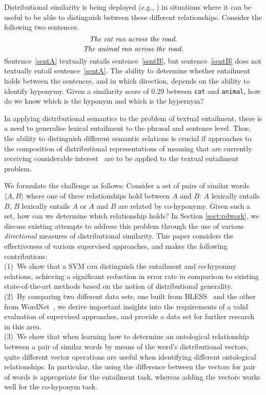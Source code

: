 \documentclass[11pt]{article}
\begin{document}
Distributional similarity is being deployed (e.g., ) in situations where it can be useful to be able to distinguish between these different relationships. Consider the following two sentences.
\begin{equation}
\label{sentA}
\mbox{\em The cat ran across the road.}
\end{equation}
\begin{equation}
\label{sentB}
\mbox{\em The animal ran across the road.}
\end{equation}
Sentence~\ref{sentA} textually entails sentence~\ref{sentB}, but sentence~\ref{sentB} does not textually entail sentence~\ref{sentA}. The ability to determine whether entailment holds between the sentences, and in which direction, depends on the ability to identify hyponymy.   Given a similarity score of 0.29 between \texttt{cat} and \texttt{animal}, how do we know which is the hyponym and which is the hypernym? 

In applying distributional semantics to the problem of textual entailment, there is a need to generalise lexical entailment to the phrasal and sentence level. Thus, the ability to distinguish different semantic relations is crucial if approaches to the composition of distributional representations of meaning that are currently receiving considerable interest~\cite{Widdows:08,Mitchell:08,Baroni2010,Grefenstette:11,Socher:12} are to be applied to the textual entailment problem.

We formulate the challenge as follows: Consider a set of pairs of similar words $\langle A,B\rangle$ where one of three relationships hold between $A$ and $B$: $A$ lexically entails $B$, $B$ lexically entails $A$ or  $A$ and $B$ are related by co-hyponymy. Given such a set, how can we determine which relationship holds? In Section \ref{sect:relwork}, we discuss existing attempts to address this problem through the use of various \emph{directional} measures of distributional similarity.  This paper  considers the effectiveness of various supervised approaches, and makes the following contributions:\\[2pt]
(1)~We show that a SVM can distinguish the entailment and co-hyponmy relations, achieving a significant reduction in error rate in comparison to  existing state-of-the-art methods based on the notion of distributional generality.\\[2pt]
(2)~By comparing two  different data sets, one built from  BLESS~\cite{Baroni2011} and the other from WordNet~\cite{Fellbaum:98}, we derive important insights into the requirements of a valid evaluation of supervised approaches, and provide a data set for further research in this area.\\[2pt]
(3)~We show that when learning how to determine an ontological relationship between a pair of similar words by means of the word's distributional vectors, quite different vector operations are useful when identifying different ontological relationships. In particular, the using the difference between the vectors for pair of words is appropriate for the entailment task, whereas adding the vectors works well for the co-hyponym task.
\end{document}
